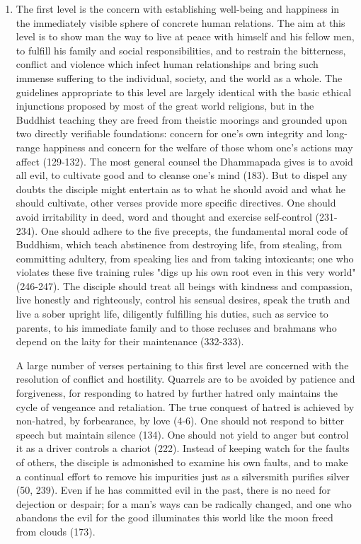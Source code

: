 \begin{enumerate}[i]
\item The first level is the concern with establishing well-being and happiness in the immediately visible sphere of concrete human relations. The aim at this level is to show man the way to live at peace with himself and his fellow men, to fulfill his family and social responsibilities, and to restrain the bitterness, conflict and violence which infect human relationships and bring such immense suffering to the individual, society, and the world as a whole. The guidelines appropriate to this level are largely identical with the basic ethical injunctions proposed by most of the great world religions, but in the Buddhist teaching they are freed from theistic moorings and grounded upon two directly verifiable foundations: concern for one's own integrity and long-range happiness and concern for the welfare of those whom one's actions may affect (129-132). The most general counsel the Dhammapada gives is to avoid all evil, to cultivate good and to cleanse one's mind (183). But to dispel any doubts the disciple might entertain as to what he should avoid and what he should cultivate, other verses provide more specific directives. One should avoid irritability in deed, word and thought and exercise self-control (231-234). One should adhere to the five precepts, the fundamental moral code of Buddhism, which teach abstinence from destroying life, from stealing, from committing adultery, from speaking lies and from taking intoxicants; one who violates these five training rules "digs up his own root even in this very world" (246-247). The disciple should treat all beings with kindness and compassion, live honestly and righteously, control his sensual desires, speak the truth and live a sober upright life, diligently fulfilling his duties, such as service to parents, to his immediate family and to those recluses and brahmans who depend on the laity for their maintenance (332-333).

A large number of verses pertaining to this first level are concerned with the resolution of conflict and hostility. Quarrels are to be avoided by patience and forgiveness, for responding to hatred by further hatred only maintains the cycle of vengeance and retaliation. The true conquest of hatred is achieved by non-hatred, by forbearance, by love (4-6). One should not respond to bitter speech but maintain silence (134). One should not yield to anger but control it as a driver controls a chariot (222). Instead of keeping watch for the faults of others, the disciple is admonished to examine his own faults, and to make a continual effort to remove his impurities just as a silversmith purifies silver (50, 239). Even if he has committed evil in the past, there is no need for dejection or despair; for a man's ways can be radically changed, and one who abandons the evil for the good illuminates this world like the moon freed from clouds (173).


\end{enumerate}
